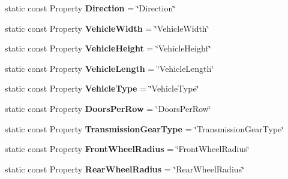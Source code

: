 \begin{DoxyCompactItemize}
\item 
\hypertarget{classVehicleProperty_a89d7508f610bdbbeaaec742ee3d4f656}{static const Property {\bfseries Direction} = \char`\"{}Direction\char`\"{}}\label{classVehicleProperty_a89d7508f610bdbbeaaec742ee3d4f656}

\item 
\hypertarget{classVehicleProperty_a4e3c78c74cee15e4f0c8b5f1c11215e7}{static const Property {\bfseries Vehicle\-Width} = \char`\"{}Vehicle\-Width\char`\"{}}\label{classVehicleProperty_a4e3c78c74cee15e4f0c8b5f1c11215e7}

\item 
\hypertarget{classVehicleProperty_a0fde8e98bbffe557982301ecfbe595b1}{static const Property {\bfseries Vehicle\-Height} = \char`\"{}Vehicle\-Height\char`\"{}}\label{classVehicleProperty_a0fde8e98bbffe557982301ecfbe595b1}

\item 
\hypertarget{classVehicleProperty_a9f2d02d1ff69cf8547c6bf8b4ab20a93}{static const Property {\bfseries Vehicle\-Length} = \char`\"{}Vehicle\-Length\char`\"{}}\label{classVehicleProperty_a9f2d02d1ff69cf8547c6bf8b4ab20a93}

\item 
\hypertarget{classVehicleProperty_a5f6f4c19869a4d6307a38bbcb14f3325}{static const Property {\bfseries Vehicle\-Type} = \char`\"{}Vehicle\-Type\char`\"{}}\label{classVehicleProperty_a5f6f4c19869a4d6307a38bbcb14f3325}

\item 
\hypertarget{classVehicleProperty_a0818b919a2721ebc9242fe4fd62c1c06}{static const Property {\bfseries Doors\-Per\-Row} = \char`\"{}Doors\-Per\-Row\char`\"{}}\label{classVehicleProperty_a0818b919a2721ebc9242fe4fd62c1c06}

\item 
\hypertarget{classVehicleProperty_a1255b40637cabbcc28901a9ca5efce8c}{static const Property {\bfseries Transmission\-Gear\-Type} = \char`\"{}Transmission\-Gear\-Type\char`\"{}}\label{classVehicleProperty_a1255b40637cabbcc28901a9ca5efce8c}

\item 
\hypertarget{classVehicleProperty_a61603d2610548667c65b21e2e5dc146b}{static const Property {\bfseries Front\-Wheel\-Radius} = \char`\"{}Front\-Wheel\-Radius\char`\"{}}\label{classVehicleProperty_a61603d2610548667c65b21e2e5dc146b}

\item 
\hypertarget{classVehicleProperty_a7317a413f21ad1c44667ada3883be9e6}{static const Property {\bfseries Rear\-Wheel\-Radius} = \char`\"{}Rear\-Wheel\-Radius\char`\"{}}\label{classVehicleProperty_a7317a413f21ad1c44667ada3883be9e6}


\end{DoxyCompactItemize}
